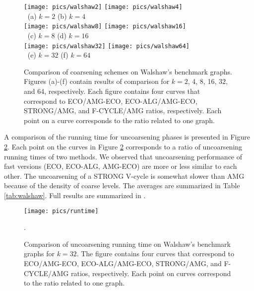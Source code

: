 \documentclass{llncs}
\begin{document}
\begin{figure}
\texttt{[image: pics/walshaw2]}  \hspace{-1cm} 
\texttt{[image: pics/walshaw4]}\\
$~$ \hspace{3cm} (a) $k=2$ \hspace{5.5cm} (b) $k=4$ \\
\texttt{[image: pics/walshaw8]}  \hspace{-1cm}
\texttt{[image: pics/walshaw16]}\\
$~$ \hspace{3cm} (c) $k=8$ \hspace{5.5cm} (d) $k=16$ \\
\texttt{[image: pics/walshaw32]}  \hspace{-1cm}
\texttt{[image: pics/walshaw64]}\\
$~$ \hspace{3cm} (e) $k=32$ \hspace{5.5cm} (f) $k=64$ \\
\caption{Comparison of coarsening schemes on Walshaw's benchmark graphs. Figures (a)-(f) contain results of comparison for $k=2$, 4, 8, 16, 32, and 64, respectively. Each figure contains four curves that correspond to ECO/AMG-ECO, ECO-ALG/AMG-ECO, STRONG/AMG, and F-CYCLE/AMG ratios, respectively. Each point on a curve corresponds to the ratio related to one graph.}\label{fig:walshaw} 
\end{figure}
A comparison of the running time for uncoarsening phases is presented in Figure \ref{fig:runtimewalshaw}. Each point on the curves in Figure \ref{fig:runtimewalshaw} corresponds to a ratio of uncoarsening running times of two methods. We observed that uncoarsening performance of fast versions (ECO, ECO-ALG, AMG-ECO) are more or less similar to each other. The uncoarsening of a STRONG V-cycle is somewhat slower than AMG because of the density of coarse levels. 
The averages are summarized in Table \ref{tab:walshaw}. Full results are summarized in \cite{hardpart-site}.
\begin{figure}
\centering
\texttt{[image: pics/runtime]}
\caption{Comparison of uncoarsening running time on Walshaw's benchmark graphs for $k=32$. The figure contains four curves that correspond to ECO/AMG-ECO, ECO-ALG/AMG-ECO, STRONG/AMG, and F-CYCLE/AMG ratios, respectively. Each point on curves correspond to the ratio related to one graph.}\label{fig:runtimewalshaw}. 
\vspace*{-.5cm}
\end{figure}
\end{document}
